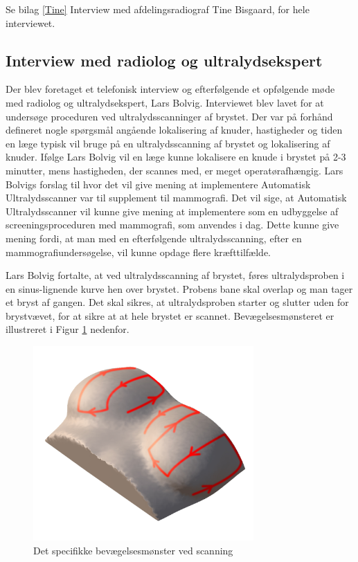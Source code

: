 Se bilag \ref{Tine} Interview med afdelingsradiograf Tine Bisgaard, for hele interviewet. 

\subsection{Interview med radiolog og ultralydsekspert}
Der blev foretaget et telefonisk interview og efterfølgende et opfølgende møde med radiolog og ultralydsekspert, Lars Bolvig. Interviewet blev lavet for at undersøge proceduren ved ultralydsscanninger af brystet. Der var på forhånd defineret nogle spørgsmål angående lokalisering af knuder, hastigheder og tiden en læge typisk vil bruge på en ultralydsscanning af brystet og lokalisering af knuder. Ifølge Lars Bolvig vil en læge kunne lokalisere en knude i brystet på 2-3 minutter, mens hastigheden, der scannes med, er meget operatørafhængig. Lars Bolvigs forslag til hvor det vil give mening at implementere Automatisk Ultralydsscanner var til supplement til mammografi. Det vil sige, at Automatisk Ultralydsscanner vil kunne give mening at implementere som en udbyggelse af screeningsproceduren med mammografi, som anvendes i dag. Dette kunne give mening fordi, at man med en efterfølgende ultralydsscanning, efter en mammografiundersøgelse, vil kunne opdage flere kræfttilfælde. 

Lars Bolvig fortalte, at ved ultralydsscanning af brystet, føres ultralydsproben i en sinus-lignende kurve hen over brystet. Probens bane skal overlap og man tager et bryst af gangen. Det skal sikres, at ultralydsproben starter og slutter uden for brystvævet, for at sikre at at hele brystet er scannet. Bevægelsesmønsteret er illustreret i Figur \ref{Probensbevagelse} nedenfor. 

\begin{figure}[H]
    \centering
    \includegraphics[width=0.75\textwidth]{figurer/d/probebevagelse}
    \caption{Det specifikke bevægelsesmønster ved scanning}
    \label{Probensbevagelse}
\end{figure}

